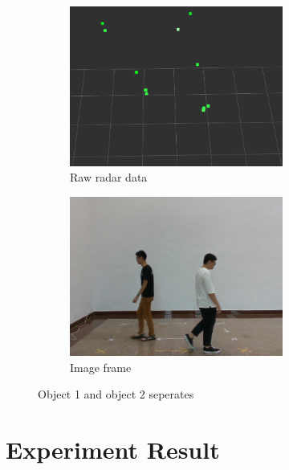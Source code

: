 \begin{figure}[!htb]
    \centering
    \begin{subfigure}{0.3\linewidth}
        \includegraphics[width=7cm]{Figures/after_conceal_radar.png}
        \caption{Raw radar data}
        \label{subfig:after_conceal_radar_fig}
    \end{subfigure}
    \hspace{0.15\textwidth}
    \begin{subfigure}{0.3\linewidth}
        \includegraphics[width=7cm]{Figures/after_conceal_image.png}
        \caption{Image frame}
        \label{subfig:after_conceal_image_fig}
    \end{subfigure}

    \caption{Object 1 and object 2 seperates}
    \label{fig:after_conceal_fig}
\end{figure}





\vspace*{5cm}
\section{Experiment Result}\label{sec:3-exp_result}
